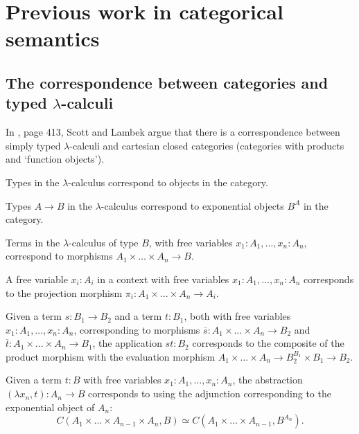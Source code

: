 \chapter{Previous work in categorical semantics}

\section{The correspondence between categories and typed \texorpdfstring{$ \lambda $}{lambda}-calculi}
In \cite{curry}, page 413, Scott and Lambek argue that there is a correspondence between simply typed $ \lambda $-calculi and cartesian closed categories (categories with products and `function objects').

Types in the $ \lambda $-calculus correspond to objects in the category.

Types $ A \to B $ in the $ \lambda $-calculus correspond to exponential objects $ B^A $ in the category.

Terms in the $ \lambda $-calculus of type $ B $, with free variables $ x_1: A_1, \dots, x_n: A_n $, correspond to morphisms $ A_1 \times \dots \times A_n \to B $.

A free variable $ x_i: A_i $ in a context with free variables $ x_1: A_1, \dots, x_n: A_n $ corresponds to the projection morphism $ \pi_i : A_1 \times \dots \times A_n \to A_i $.

Given a term $ s: B_1 \to B_2 $ and a term $ t: B_1 $, both with free variables $ x_1: A_1, \dots, x_n: A_n $, corresponding to morphisms $ \overline s: A_1 \times \dots \times A_n \to B_2 $ and $ \overline t: A_1 \times \dots \times A_n \to B_1 $, the application $ st: B_2 $ corresponds to the composite of the product morphism with the evaluation morphism $ A_1 \times \dots \times A_n \to B_2^{B_1} \times B_1 \to B_2 $.
\begin{center}
\end{center}

Given a term $ t: B $ with free variables $ x_1: A_1, \dots, x_n: A_n $, the abstraction $ (\lambda x_n, t): A_n \to B $ corresponds to using the adjunction corresponding to the exponential object of $ A_n $:
\[ C(A_1 \times \dots \times A_{n-1} \times A_n, B) \simeq C(A_1 \times \dots \times A_{n-1}, B^{A_n}). \]

